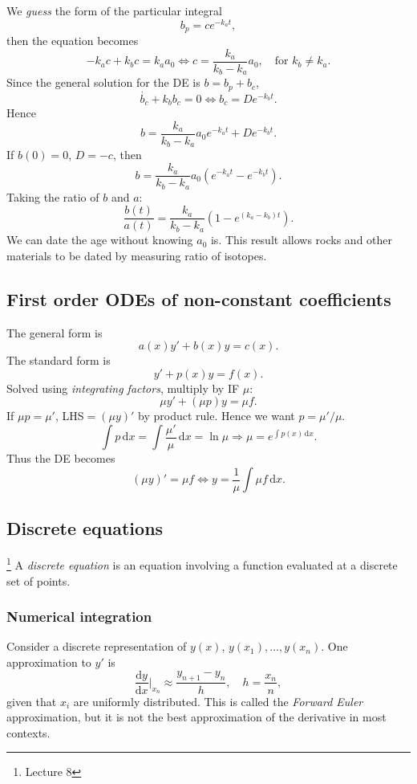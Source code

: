\documentclass[a4paper]{article}
\begin{document}
    We \textit{guess} the form of the particular integral
    \[
        b_p = ce^{-k_a t}
    ,\]
    then the equation becomes 
    \[
        -k_a c+k_b c = k_a a_0 \Longleftrightarrow c=\frac{k_a}{k_b-k_a}a_0,\quad \text{for }k_b\neq k_a
    .\]
    Since the general solution for the DE is $b=b_p+b_c$,
    \[
        \dot{b_c}+k_b b_c = 0 \Longleftrightarrow b_c = De^{-k_b t}
    .\]
    Hence
    \[
        b=\frac{k_{a}}{k_{b}-k_{a}} a_{0} e^{-k_{a} t}+D e^{-k_{b} t}
    .\]
    If $b(0)=0$, $ D = -c $, then 
    \[
        b = \frac{k_a}{k_b-k_a}a_0\left( e^{-k_a t}-e^{-k_b t} \right)
    .\]
    Taking the ratio of $ b $ and $a$:
    \[
        \frac{b(t)}{a(t)} = \frac{k_a}{k_b-k_a}\left( 1-e^{(k_a-k_b)t} \right)
    .\]
    We can date the age without knowing $a_0$ is. This result allows rocks and other materials to be dated by measuring ratio of isotopes.
    \subsection{First order ODEs of non-constant coefficients}
    The general form is 
    \[
        a(x)y'+b(x)y = c(x)
    .\]
    The standard form is 
    \[
        y'+ p(x)y=f(x)
    .\]
    Solved using \textit{integrating factors}, multiply by IF $\mu$:
    \[
        \mu y'+(\mu p)y=\mu f
    .\]
    If $ \mu p=\mu' $, LHS$= (\mu y)' $ by product rule. Hence we want $p = \mu'/\mu$.
    \[
        \int p \,\mathrm{d}x = \int \frac{\mu'}{\mu} \,\mathrm{d}x = \ln \mu \Longrightarrow\boxed{\mu = e^{\int p(x) \,\mathrm{d}x}}
    .\]
    Thus the DE becomes 
    \[
        (\mu y)' = \mu f \Longleftrightarrow y = \frac{1}{\mu}\int \mu f \,\mathrm{d}x
    .\]
    \subsection{Discrete equations}\footnote{Lecture 8}
    A \textit{discrete equation} is an equation involving a function evaluated at a discrete set of points.
    \subsubsection{Numerical integration}
    Consider a discrete representation of $y(x)$, $ y(x_1),\dots,y(x_{n}) $. One approximation to $y'$ is 
    \[
        \frac{\mathrm{d}y}{\mathrm{d}x}\Big|_{x_n} \approx \frac{y_{n+1}-y_n}{h},\quad h=\frac{x_n}{n} 
    ,\]
    given that $x_i$ are uniformly distributed. This is called the \textit{Forward Euler} approximation, but it is not the best approximation of the derivative in most contexts.
    
\end{document}
